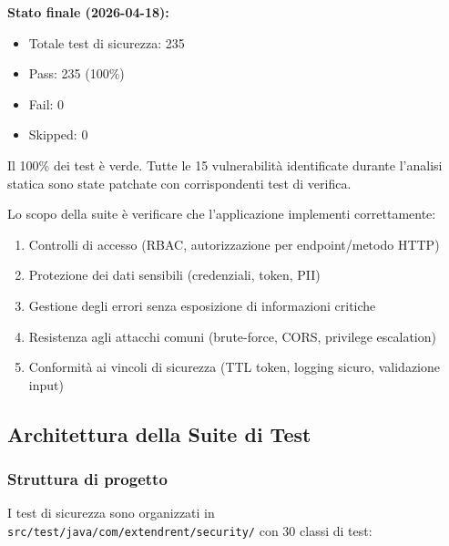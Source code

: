 \documentclass[12pt, a4paper]{article}
\begin{document}
    \textbf{Stato finale (2026-04-18):}
    \begin{itemize}
        \item Totale test di sicurezza: 235
        \item Pass: 235 (100\%)
        \item Fail: 0
        \item Skipped: 0
    \end{itemize}

    Il 100\% dei test è verde. Tutte le 15 vulnerabilità identificate durante l'analisi
    statica sono state patchate con corrispondenti test di verifica.

    Lo scopo della suite è verificare che l'applicazione implementi correttamente:
    \begin{enumerate}
        \item Controlli di accesso (RBAC, autorizzazione per endpoint/metodo HTTP)
        \item Protezione dei dati sensibili (credenziali, token, PII)
        \item Gestione degli errori senza esposizione di informazioni critiche
        \item Resistenza agli attacchi comuni (brute-force, CORS, privilege escalation)
        \item Conformità ai vincoli di sicurezza (TTL token, logging sicuro, validazione input)
    \end{enumerate}

    \subsection{Architettura della Suite di Test}
    \label{subsec:security_architecture}

    \subsubsection{Struttura di progetto}

    I test di sicurezza sono organizzati in \texttt{src/test/java/com/extendrent/security/}
    con 30 classi di test:
\end{document}
